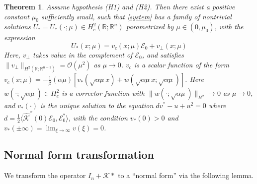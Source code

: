 \documentclass[letterpaper,11pt]{article}
\newcommand{\R}{\mathbb{R}}
\newcommand{\rmO}{\mathcal{O}}
\newcommand{\K}{\mathcal{K}}
\numberwithin{equation}{section}
\theoremstyle{plain}
\newtheorem{theorem}{Theorem}[section]
\theoremstyle{remark}
\begin{document}
\begin{theorem}\label{MainRes} Assume hypothesis (H1) and (H2). Then there exist a positive constant 
$\mu_0$ sufficiently small, such that \eqref{system} has a family 
of nontrivial solutions $U_*=U_*(\cdot;\mu) \in H_e^2(\R;\R^n)$ 
parametrized by $\mu\in (0,\mu_0) $, with the expression 
\begin{equation}\label{expan}
U_*(x;\mu) =  v_c(x;\mu)\mathcal{E}_0 + v_{\perp}(x;\mu)
\end{equation}
Here, $v_{\perp}$ takes value in the complement of $\mathcal{E}_0$, and satisfies $\|v_{\perp}\|_{H^2(\R;\R^{n-1})} = \rmO(\mu^2)$ as $\mu \to 0$. $v_c$ is a scalar function of the form 
$v_c(x; \mu)=-\frac{1}{\beta} (\alpha\mu)\left[ v_*(\sqrt{\alpha\mu}x)+w(\sqrt{\alpha\mu}x;\sqrt{\alpha\mu}) \right]$. Here $w(\cdot;\sqrt{\alpha\mu}) \in H^2_e$ is a corrector function with $\|w(\cdot;\sqrt{\alpha\mu})\|_{H^2} \to 0$ as $\mu \to 0$, and $v_*(\cdot)$ is the unique solution to the equation $dv^{''} -u+u^2 =0$ where $d = \frac{1}{2}\langle \widehat{\K}^{''}(0)\mathcal{E}_0,\mathcal{E}_0^*\rangle$, with the condition 
$v_*(0)>0$ and $v_*(\pm\infty)=\lim_{\xi \to \infty} v(\xi)=0$.

\end{theorem}
\subsection{Normal form transformation}
We transform the operator $I_n+\K \ast$ to a ``normal form'' via the following lemma.
\end{document}
